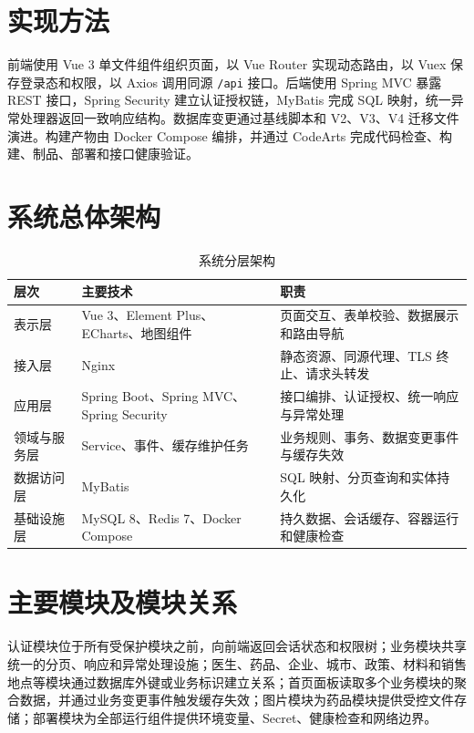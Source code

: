\documentclass[UTF8,a4paper,12pt,openany,fontset=windows]{ctexrep}
\begin{document}
\section{实现方法}

前端使用 Vue 3 单文件组件组织页面，以 Vue Router 实现动态路由，以 Vuex 保存登录态和权限，以 Axios 调用同源 \texttt{/api} 接口。后端使用 Spring MVC 暴露 REST 接口，Spring Security 建立认证授权链，MyBatis 完成 SQL 映射，统一异常处理器返回一致响应结构。数据库变更通过基线脚本和 V2、V3、V4 迁移文件演进。构建产物由 Docker Compose 编排，并通过 CodeArts 完成代码检查、构建、制品、部署和接口健康验证。

\section{系统总体架构}

\begin{table}[H]
  \centering
  \caption{系统分层架构}
  \begin{tabularx}{\textwidth}{p{2.6cm}p{4.0cm}L}
    \toprule
    层次 & 主要技术 & 职责 \\
    \midrule
    表示层 & Vue 3、Element Plus、ECharts、地图组件 & 页面交互、表单校验、数据展示和路由导航 \\
    接入层 & Nginx & 静态资源、同源代理、TLS 终止、请求头转发 \\
    应用层 & Spring Boot、Spring MVC、Spring Security & 接口编排、认证授权、统一响应与异常处理 \\
    领域与服务层 & Service、事件、缓存维护任务 & 业务规则、事务、数据变更事件与缓存失效 \\
    数据访问层 & MyBatis & SQL 映射、分页查询和实体持久化 \\
    基础设施层 & MySQL 8、Redis 7、Docker Compose & 持久数据、会话缓存、容器运行和健康检查 \\
    \bottomrule
  \end{tabularx}
\end{table}

\section{主要模块及模块关系}

认证模块位于所有受保护模块之前，向前端返回会话状态和权限树；业务模块共享统一的分页、响应和异常处理设施；医生、药品、企业、城市、政策、材料和销售地点等模块通过数据库外键或业务标识建立关系；首页面板读取多个业务模块的聚合数据，并通过业务变更事件触发缓存失效；图片模块为药品模块提供受控文件存储；部署模块为全部运行组件提供环境变量、Secret、健康检查和网络边界。
\end{document}
